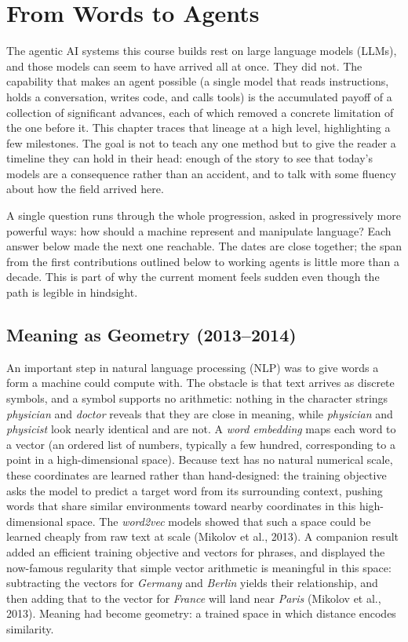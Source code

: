 \chapter{From Words to Agents}
\label{chapter:HowWeGotHere}

The agentic AI systems this course builds rest on large language models (LLMs), and those models can seem to have arrived all at once.
They did not.
The capability that makes an agent possible (a single model that reads instructions, holds a conversation, writes code, and calls tools) is the accumulated payoff of a collection of significant advances, each of which removed a concrete limitation of the one before it.
This chapter traces that lineage at a high level, highlighting a few milestones.
The goal is not to teach any one method but to give the reader a timeline they can hold in their head: enough of the story to see that today's models are a consequence rather than an accident, and to talk with some fluency about how the field arrived here.

A single question runs through the whole progression, asked in progressively more powerful ways: how should a machine represent and manipulate language?
Each answer below made the next one reachable.
The dates are close together; the span from the first contributions outlined below to working agents is little more than a decade.
This is part of why the current moment feels sudden even though the path is legible in hindsight.

\section{Meaning as Geometry (2013--2014)}
\label{section:MeaningAsGeometry}

An important step in natural language processing (NLP) was to give words a form a machine could compute with.
The obstacle is that text arrives as discrete symbols, and a symbol supports no arithmetic: nothing in the character strings \emph{physician} and \emph{doctor} reveals that they are close in meaning, while \emph{physician} and \emph{physicist} look nearly identical and are not.
A \emph{word embedding} maps each word to a vector (an ordered list of numbers, typically a few hundred, corresponding to a point in a high-dimensional space). 
Because text has no natural numerical scale, these coordinates are learned rather than hand-designed: the training objective asks the model to predict a target word from its surrounding context, pushing words that share similar environments toward nearby coordinates in this high-dimensional space.
The \emph{word2vec} models showed that such a space could be learned cheaply from raw text at scale (Mikolov et al., 2013).
A companion result added an efficient training objective and vectors for phrases, and displayed the now-famous regularity that simple vector arithmetic is meaningful in this space: subtracting the vectors for \emph{Germany} and \emph{Berlin} yields their relationship, and then adding that to the vector for \emph{France} will land near \emph{Paris} (Mikolov et al., 2013).
Meaning had become geometry: a trained space in which distance encodes similarity.

